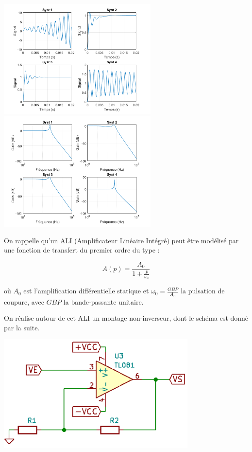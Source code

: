 \begin{center}
	\includegraphics[width=8cm]{images/TD/sys_boucle_corrige_step.png} \includegraphics[width=8cm]{images/TD/sys_boucle_corrige_bode.png} 
\end{center}



On rappelle qu'un ALI (Amplificateur Linéaire Intégré) peut être modélisé par une fonction de transfert du premier ordre du type : 

$$A(p) = \frac{A_0}{1 + \frac{p}{\omega_0}}$$

où $A_0$ est l'amplification différentielle statique et $\omega_0 = \frac{GBP}{A_0}$ la pulsation de coupure, avec $GBP$ la bande-passante unitaire.

On réalise autour de cet ALI un montage non-inverseur, dont le schéma est donné par la suite.

\begin{center}
	\includegraphics[width=10cm]{images/TD/noninverseur.png}
\end{center}


